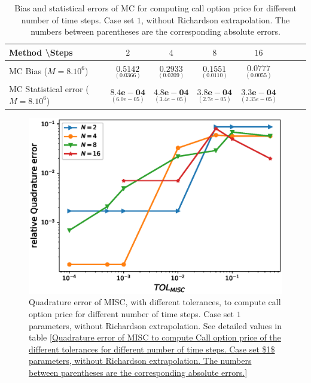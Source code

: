\begin{table}[h!]
	\centering
	\begin{tabular}{l*{6}{c}r}
		Method \textbackslash  Steps            & $2$ & $4$ & $8$ & $16$  \\
		\hline
		MC Bias ($M=8.10^6$)   & 	$ \underset{( 0.0366)}{\mathbf{0.5142}}$  & $\underset{( 0.0209)}{\mathbf{0.2933}}$  & $\underset{( 0.0110)}{\mathbf{0.1551}}$ & $\underset{( 0.0055)}{\mathbf{0.0777}}$\\ 
		
		MC Statistical error ($M=8.10^6$)  &  $\underset{(  6.0e-05)} {\mathbf{8.4e-04}}$  & $\underset{(3.4e-05)} {\mathbf{4.8e-04}}$  & $\underset{(2.7e-05)} {\mathbf{ 3.8e-04}}$ & $\underset{( 2.35e-05)} {\mathbf{3.3e-04}}$	\\

		\hline
	\end{tabular}
	\caption{Bias and statistical errors of MC  for computing call option price  for different number of time steps. Case set $1$, without Richardson extrapolation. The numbers between parentheses are the corresponding absolute errors.}
	\label{Bias and Statistical errors of MC ($M=10^6$)  for computing Call option price  for different number of time steps. Case set 1, without Richardson extrapolation. The numbers between parentheses are the corresponding absolute errors.}
\end{table}








\begin{figure}[h!]
	\centering
	\includegraphics[width=0.5\linewidth]{./figures/rBergomi_MISC_quadratre_error/vs_TOL/set1/relative_quad_error_wrt_MISC_TOL_set1_non_rich}
	
	
	\caption{Quadrature error of MISC, with different tolerances, to compute call option price for different number of time steps. Case  set $1$ parameters, without Richardson extrapolation. See detailed values  in table \ref{Quadrature error of MISC to compute Call option price of the different tolerances for different number of time steps. Case  set $1$ parameters, without Richardson extrapolation. The numbers between parentheses are the corresponding absolute errors.}}
	\label{fig:Quadrature_error_set1}
\end{figure}




